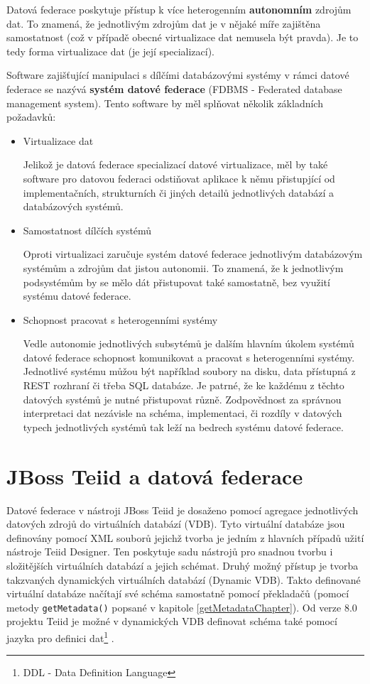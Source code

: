 \documentclass[oneside,12pt]{fithesis2}
\begin{document}
Datová federace poskytuje přístup k více heterogenním \textbf{autonomním} zdrojům dat. To znamená, že jednotlivým zdrojům dat je v nějaké míře zajištěna samostatnost (což v případě obecné virtualizace dat nemusela být pravda). Je to tedy forma virtualizace dat (je její specializací).

Software zajišťující manipulaci s dílčími databázovými systémy v rámci datové federace se nazývá \textbf{systém datové federace} (FDBMS - Federated database management system)\cite{fdbms}. Tento software by měl splňovat několik základních požadavků:
\begin{itemize}
 \item Virtualizace dat
 
 Jelikož je datová federace specializací datové virtualizace, měl by také software pro datovou federaci odstiňovat aplikace k němu přistupjící od implementačních, strukturních či jiných detailů jednotlivých databází a databázových systémů.
 
 \item Samostatnost dílčích systémů
 
 Oproti  virtualizaci zaručuje systém datové federace jednotlivým databázovým systémům a zdrojům dat jistou autonomii. To znamená, že k jednotlivým podsystémům by se mělo dát přistupovat také samostatně, bez využití systému datové federace.
 
 \item Schopnost pracovat s heterogenními systémy
 
 Vedle autonomie jednotlivých subsytémů je dalším hlavním úkolem systémů datové federace schopnost komunikovat a pracovat s heterogenními systémy. Jednotlivé systému můžou být například soubory na disku, data přístupná z REST rozhraní či třeba SQL databáze. Je patrné, že ke každému z těchto datových systémů je nutné přistupovat různě. Zodpovědnost za správnou interpretaci dat nezávisle na schéma, implementaci, či rozdíly v datových typech jednotlivých systémů tak leží na bedrech systému datové federace.
\end{itemize} 

\section{JBoss Teiid a datová federace}
Datové federace v nástroji JBoss Teiid je dosaženo pomocí agregace jednotlivých datových zdrojů do virtuálních databází (VDB). Tyto virtuální databáze jsou definovány pomocí XML souborů jejichž tvorba je jedním z hlavních případů užití nástroje Teiid Designer. Ten poskytuje sadu nástrojů pro snadnou tvorbu i složitějších virtuálních databází a jejich schémat. Druhý možný přístup je tvorba takzvaných dynamických virtuálních databází (Dynamic VDB). Takto definované virtuální databáze načítají své schéma samostatně pomocí překladačů (pomocí metody \verb'getMetadata()' popsané v kapitole \ref{getMetadataChapter}). Od verze 8.0 projektu Teiid je možné v dynamických VDB definovat schéma také pomocí jazyka pro definici dat\footnote{DDL - Data Definition Language} \cite[Reference Guide$\rightarrow$VDBs$\rightarrow$DDL Metadata]{teiidDoc}.
\end{document}
